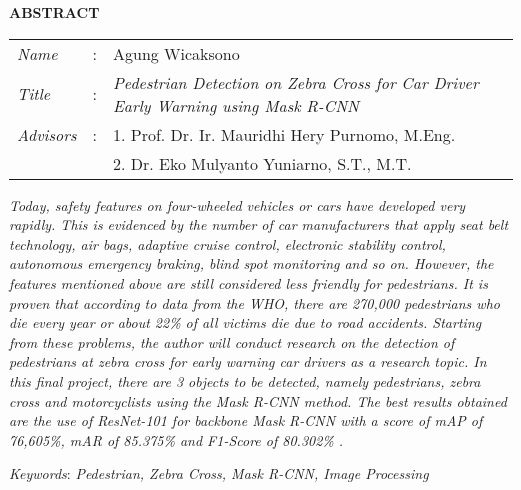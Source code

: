 \begin{center}
  \large\textbf{ABSTRACT}
\end{center}


\vspace{2ex}

\begingroup
  \setlength{\tabcolsep}{0pt}

  \noindent
  \begin{tabularx}{\textwidth}{l >{\centering}m{3em} X}
    \emph{Name}     &:& Agung Wicaksono \\

    \emph{Title}    &:& \emph{Pedestrian Detection on \textit{Zebra Cross} for Car Driver Early Warning using \textit{Mask R-CNN}} \\

    \emph{Advisors}  &:& 1. Prof. Dr. Ir. Mauridhi Hery Purnomo, M.Eng. \\
    				 & & 2. Dr. Eko Mulyanto Yuniarno, S.T., M.T. \\
  \end{tabularx}
\endgroup

\emph{Today, safety features on four-wheeled vehicles or cars have developed very rapidly. This is evidenced by the number of car manufacturers that apply seat belt technology, air bags, adaptive cruise control, electronic stability control, autonomous emergency braking, blind spot monitoring and so on. However, the features mentioned above are still considered less friendly for pedestrians. It is proven that according to data from the WHO, there are 270,000 pedestrians who die every year or about 22\% of all victims die due to road accidents. Starting from these problems, the author will conduct research on the detection of pedestrians at zebra cross for early warning car drivers as a research topic. In this final project, there are 3 objects to be detected, namely pedestrians, zebra cross and motorcyclists using the Mask R-CNN method. The best results obtained are the use of \textit{ResNet-101} for \textit{backbone Mask R-CNN} with a score of \textit{mAP} of 76,605\%, mAR of 85.375\% and \textit{F1-Score} of 80.302\% .}

\emph{Keywords}: \emph{Pedestrian, Zebra Cross, Mask R-CNN, Image Processing}
